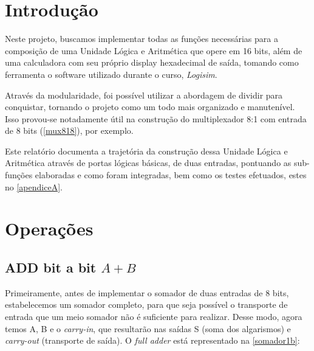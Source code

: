 \documentclass[
	12pt,				%
	openright,			%
	twoside,			%
	a4paper,			%
	english,			%
	french,				%
	spanish,			%
	brazil,				%
	]{abntex2}
\begin{document}

\frenchspacing

\imprimircapa

\imprimirfolhaderosto

\tableofcontents* %

\textual

\chapter*[Introdução]{Introdução}

Neste projeto, buscamos implementar todas as funções necessárias para a composição de uma Unidade Lógica e Aritmética que opere em 16 bits, além de uma calculadora com seu próprio display hexadecimal de saída, tomando como ferramenta o software utilizado durante o curso, \textit{Logisim}.

Através da modularidade, foi possível utilizar a abordagem de dividir para conquistar, tornando o projeto como um todo mais organizado e manutenível. Isso provou-se notadamente útil na construção do multiplexador 8:1 com entrada de 8 bits (\autoref{mux818}), por exemplo.

Este relatório documenta a trajetória da construção dessa Unidade Lógica e Aritmética através de portas lógicas básicas, de duas entradas, pontuando as sub-funções elaboradas e como foram integradas, bem como os testes efetuados, estes no \autoref{apendiceA}.


\chapter{Operações}\label{operacoes}

\section{ADD bit a bit \texorpdfstring{$A+B$}{Lg}}

Primeiramente, antes de implementar o somador de duas entradas de 8 bits, estabelecemos um somador completo, para que seja possível o transporte de entrada que um meio somador não é suficiente para realizar. Desse modo, agora temos A, B e o \textit{carry-in}, que resultarão nas saídas S (soma dos algarismos) e \textit{carry-out} (transporte de saída). O \textit{full adder} está representado na \autoref{somador1b}:
\end{document}
